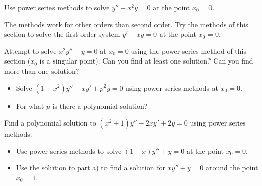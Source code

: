 \documentclass{ximera}
\begin{document}
\begin{exercise}
    Use power series methods to solve $y''+x^2y = 0$ at the point $x_0 = 0$.
\end{exercise}

\begin{exercise} 
    The methods work for other orders than second order.  Try the methods of this section to solve the first order system $y'-xy = 0$ at the point $x_0 = 0$.
\end{exercise}

\begin{exercise}%
    Attempt to solve $x^2 y'' - y = 0$ at $x_0 = 0$ using the power series method of this section ($x_0$ is a singular point). Can you find at least one solution?  Can you find more than one solution?
\end{exercise}

\begin{exercise}%
    \begin{itemize}
        \item Solve $(1-x^2)y''-xy' + p^2y = 0$ using power series methods at $x_0=0$.
        \item For what $p$ is there a polynomial solution?
    \end{itemize}
\end{exercise}

\begin{exercise}
    Find a polynomial solution to $(x^2+1) y''-2xy'+2y = 0$ using power series methods.
\end{exercise}

\begin{exercise}
    \begin{itemize}
        \item Use power series methods to solve $(1-x)y''+y = 0$ at the point $x_0 = 0$.
        \item Use the solution to part a) to find a solution for $xy''+y=0$ around the point $x_0=1$.
    \end{itemize}
\end{exercise}
\end{document}
